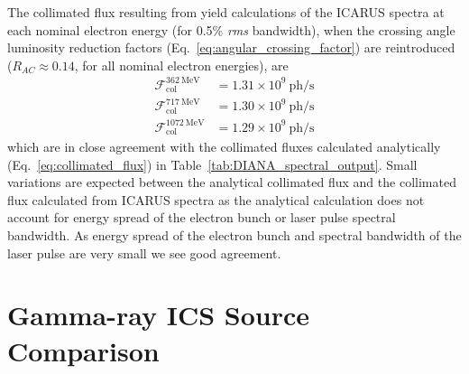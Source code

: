\documentclass[../main.tex]{subfiles}
\begin{document}
The collimated flux resulting from yield calculations of the \textsc{ICARUS} spectra at each nominal electron energy (for 0.5\% \textit{rms} bandwidth), when the crossing angle luminosity reduction factors (Eq.~\ref{eq:angular_crossing_factor}) are reintroduced ($R_{AC} \approx 0.14$, for all nominal electron energies), are
\begin{align}
\mathcal{F}_{\mathrm{col}}^{362~\si{\mega\electronvolt}} &= 1.31\times 10^{9}~\mathrm{ph}/\si{\second} \\
\mathcal{F}_{\mathrm{col}}^{717~\si{\mega\electronvolt}} &= 1.30\times 10^{9}~\mathrm{ph}/\si{\second} \\
\mathcal{F}_{\mathrm{col}}^{1072~\si{\mega\electronvolt}} &= 1.29\times 10^{9}~\mathrm{ph}/\si{\second}
\end{align}
which are in close agreement with the collimated fluxes calculated analytically (Eq.~\ref{eq:collimated_flux}) in Table~\ref{tab:DIANA_spectral_output}. Small variations are expected between the analytical collimated flux and the collimated flux calculated from \textsc{ICARUS} spectra as the analytical calculation does not account for energy spread of the electron bunch or laser pulse spectral bandwidth. As energy spread of the electron bunch and spectral bandwidth of the laser pulse are very small we see good agreement.

\section{Gamma-ray ICS Source Comparison}
\label{sec:gamma_ICS_comparison}
\end{document}
